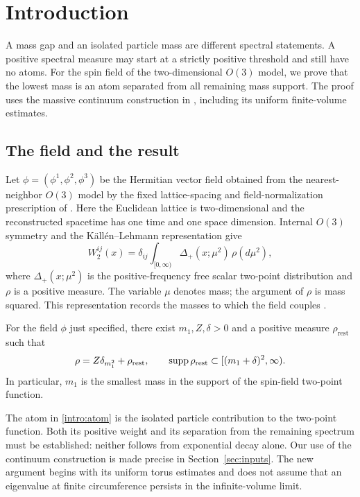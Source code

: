 \section{Introduction}
\label{sec:introduction}

A mass gap and an isolated particle mass are different spectral statements.
A positive spectral measure may start at a strictly positive threshold and
still have no atoms. For the spin field of the two-dimensional $O(3)$ model,
we prove that the lowest mass is an atom separated from all remaining mass
support. The proof uses the massive continuum construction in
\cite{OpenAI-O3}, including its uniform finite-volume estimates.

\subsection{The field and the result}

Let $\phi=(\phi^1,\phi^2,\phi^3)$ be the Hermitian vector field obtained
from the nearest-neighbor $O(3)$ model by the fixed lattice-spacing and
field-normalization prescription of \cite[Theorem~1.2]{OpenAI-O3}.
Here the Euclidean lattice is two-dimensional and the reconstructed
spacetime has one time and one space dimension. Internal $O(3)$ symmetry
and the K\"all\'en--Lehmann representation give
\begin{equation}
 W_2^{ij}(x)=\delta_{ij}\int_{[0,\infty)}
       \Delta_+(x;\mu^2)\,\rho(d\mu^2),
 \label{intro:spectral}
\end{equation}
where $\Delta_+(x;\mu^2)$ is the positive-frequency free scalar
two-point distribution and $\rho$ is a positive measure. The variable
$\mu$ denotes mass; the argument of $\rho$ is mass squared. This
representation records the masses to which the field couples
\cite{Kallen1952,Lehmann1954}.

\begin{theorem}
\label{intro:main}
For the field $\phi$ just specified, there exist $m_1,Z,\delta>0$ and a
positive measure $\rho_{\mathrm{rest}}$ such that
\begin{equation}
 \rho=Z\delta_{m_1^2}+\rho_{\mathrm{rest}},
 \qquad
 \operatorname{supp}\rho_{\mathrm{rest}}\subset[(m_1+\delta)^2,\infty).
 \label{intro:atom}
\end{equation}
In particular, $m_1$ is the smallest mass in the support of the spin-field
two-point function.
\end{theorem}

The atom in \eqref{intro:atom} is the isolated particle contribution
to the two-point function. Both its positive weight and its separation
from the remaining spectrum must be established: neither follows from
exponential decay alone. Our use of the continuum construction is made
precise in Section~\ref{sec:inputs}. The new argument begins with its
uniform torus estimates and does not assume that an eigenvalue at finite
circumference persists in the infinite-volume limit.

